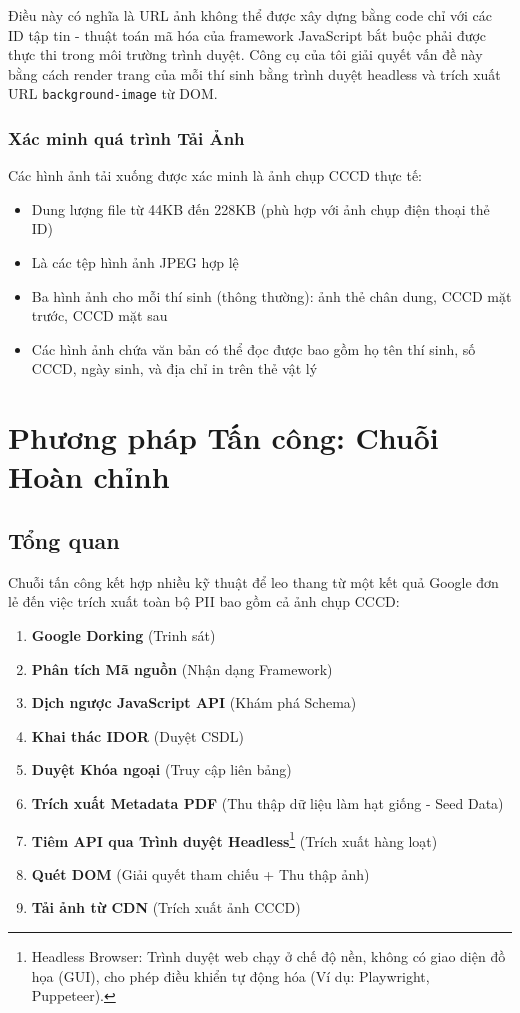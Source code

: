 \documentclass[12pt,a4paper]{article}
\begin{document}
\noindent Điều này có nghĩa là URL ảnh không thể được xây dựng bằng code chỉ với các ID tập tin - thuật toán mã hóa của framework JavaScript bắt buộc phải được thực thi trong môi trường trình duyệt. Công cụ của tôi giải quyết vấn đề này bằng cách render trang của mỗi thí sinh bằng trình duyệt headless và trích xuất URL \texttt{background-image} từ DOM.

\subsubsection{Xác minh quá trình Tải Ảnh}

Các hình ảnh tải xuống được xác minh là ảnh chụp CCCD thực tế:
\begin{itemize}[noitemsep]
    \item Dung lượng file từ 44KB đến 228KB (phù hợp với ảnh chụp điện thoại thẻ ID)
    \item Là các tệp hình ảnh JPEG hợp lệ
    \item Ba hình ảnh cho mỗi thí sinh (thông thường): ảnh thẻ chân dung, CCCD mặt trước, CCCD mặt sau
    \item Các hình ảnh chứa văn bản có thể đọc được bao gồm họ tên thí sinh, số CCCD, ngày sinh, và địa chỉ in trên thẻ vật lý
\end{itemize}

\section{Phương pháp Tấn công: Chuỗi Hoàn chỉnh}
\label{sec:attack}

\subsection{Tổng quan}

Chuỗi tấn công kết hợp nhiều kỹ thuật để leo thang từ một kết quả Google đơn lẻ đến việc trích xuất toàn bộ PII bao gồm cả ảnh chụp CCCD:

\begin{enumerate}
    \item \textbf{Google Dorking} (Trinh sát)
    \item \textbf{Phân tích Mã nguồn} (Nhận dạng Framework)
    \item \textbf{Dịch ngược JavaScript API} (Khám phá Schema)
    \item \textbf{Khai thác IDOR} (Duyệt CSDL)
    \item \textbf{Duyệt Khóa ngoại} (Truy cập liên bảng)
    \item \textbf{Trích xuất Metadata PDF} (Thu thập dữ liệu làm hạt giống - Seed Data)
    \item \textbf{Tiêm API qua Trình duyệt Headless}\footnote{Headless Browser: Trình duyệt web chạy ở chế độ nền, không có giao diện đồ họa (GUI), cho phép điều khiển tự động hóa (Ví dụ: Playwright, Puppeteer).} (Trích xuất hàng loạt)
    \item \textbf{Quét DOM} (Giải quyết tham chiếu + Thu thập ảnh)
    \item \textbf{Tải ảnh từ CDN} (Trích xuất ảnh CCCD)
\end{enumerate}
\end{document}
